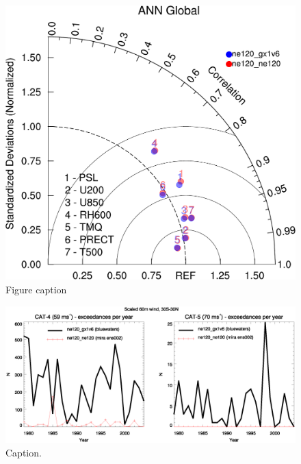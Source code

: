 \documentclass[draft,ms]{AGUTeX}
\begin{document}
\begin{figure}
\includegraphics[width=0.7\linewidth]{fig_taylor_globe_ANN.pdf}
\caption{Figure caption}
\label{fig:taylor_global}
\end{figure}

\begin{figure}
\includegraphics[width=0.8\linewidth]{fig_Maxwind-exceedance.eps}
\caption{Caption.}
\label{fig:wind-pdfs}
\end{figure}
\end{document}
